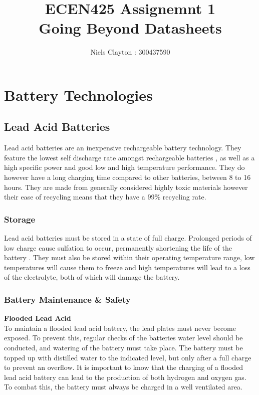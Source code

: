 \documentclass[a4paper,11pt, twocolumn]{article}
\begin{document}
\title{\LARGE{\textbf{ECEN425 Assignemnt 1}\\Going Beyond Datasheets}}
\author{Niels Clayton : 300437590}
\date{}
\maketitle

\section{Battery Technologies} 

\subsection{Lead Acid Batteries}

Lead acid batteries are an inexpensive rechargeable battery technology. They feature the lowest self discharge rate amongst rechargeable batteries \cite{lead_acid}, as well as a high specific power and good low and high temperature performance. They do however have a long charging time compared to other batteries, between 8 to 16 hours. They are made from generally considered highly toxic materials however their ease of recycling means that they have a 99\% recycling rate. 

\subsubsection{Storage}

Lead acid batteries must be stored in a state of full charge. Prolonged periods of low charge cause sulfation to occur, permanently shortening the life of the battery \cite{sulfation}. They must also be stored within their operating temperature range, low temperatures will cause them to freeze and high temperatures will lead to a loss of the electrolyte, both of which will damage the battery.

\subsubsection{Battery Maintenance \& Safety}

\textbf{Flooded Lead Acid}\\
To maintain a flooded lead acid battery, the lead plates must never become exposed. To prevent this, regular checks of the batteries water level should be conducted, and watering of the battery must take place. The battery must be topped up with distilled water to the indicated level, but only after a full charge to prevent an overflow.
It is important to know that the charging of a flooded lead acid battery can lead to the production of both hydrogen and oxygen gas. To combat this, the battery must always be charged in a well ventilated area. \\
\end{document}
